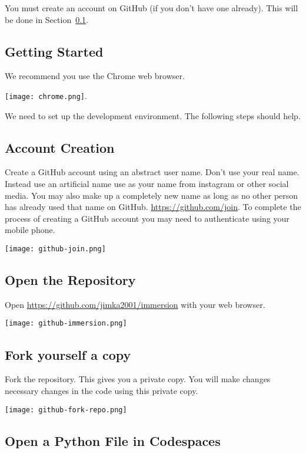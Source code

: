 You must create an account on GitHub (if you don't have one already).
This will be done in Section~\ref{sec.setup}.


\subsection{Getting Started}
\label{sec.setup}

We recommend you use the Chrome web browser.

\texttt{[image: chrome.png]}.

We need to set up the development environment.  The following steps should
help.

\subsection{Account Creation}
  
Create a GitHub account using an abstract user name.  Don't use your
real name.  Instead use an artificial name use as your name from
instagram or other social media.  You may also make up a completely
new name as long as no other person has already used that name on
GitHub.  \url{https://github.com/join}.  To complete the process of
creating a GitHub account you may need to authenticate using your
mobile phone.


\noindent\texttt{[image: github-join.png]}



\subsection{Open the Repository}
  
Open \url{https://github.com/jimka2001/immersion} with your web browser.

\noindent\texttt{[image: github-immersion.png]}


\subsection{Fork yourself a copy}

Fork the repository.  This gives you a private copy.  You will make changes
necessary changes in the code using this private copy.

\noindent \texttt{[image: github-fork-repo.png]}



\subsection{Open a Python File in Codespaces}
  
